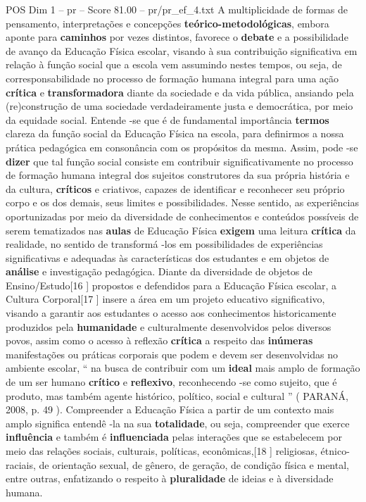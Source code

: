 \begin{textsample}{POS Dim 1 – pr – Score 81.00 – pr/pr\_ef\_4.txt}
A multiplicidade de formas de pensamento, interpretações e concepções \textbf{teórico-metodológicas}, embora aponte para \textbf{caminhos} por vezes distintos, favorece o \textbf{debate} e a possibilidade de avanço da Educação Física escolar, visando à sua contribuição significativa em relação à função social que a escola vem assumindo nestes tempos, ou seja, de corresponsabilidade no processo de formação humana integral para uma ação \textbf{crítica} e \textbf{transformadora} diante da sociedade e da vida pública, ansiando pela (re)construção de uma sociedade verdadeiramente justa e democrática, por meio da equidade social.
Entende -se que é de fundamental importância \textbf{termos} clareza da função social da Educação Física na escola, para definirmos a nossa prática pedagógica em consonância com os propósitos da mesma.
Assim, pode -se \textbf{dizer} que tal função social consiste em contribuir significativamente no processo de formação humana integral dos sujeitos construtores da sua própria história e da cultura, \textbf{críticos} e criativos, capazes de identificar e reconhecer seu próprio corpo e os dos demais, seus limites e possibilidades.
Nesse sentido, as experiências oportunizadas por meio da diversidade de conhecimentos e conteúdos possíveis de serem tematizados nas \textbf{aulas} de Educação Física \textbf{exigem} uma leitura \textbf{crítica} da realidade, no sentido de transformá -los em possibilidades de experiências significativas e adequadas às características dos estudantes e em objetos de \textbf{análise} e investigação pedagógica.
Diante da diversidade de objetos de Ensino/Estudo[16 ] propostos e defendidos para a Educação Física escolar, a Cultura Corporal[17 ] insere a área em um projeto educativo significativo, visando a garantir aos estudantes o acesso aos conhecimentos historicamente produzidos pela \textbf{humanidade} e culturalmente desenvolvidos pelos diversos povos, assim como o acesso à reflexão \textbf{crítica} a respeito das \textbf{inúmeras} manifestações ou práticas corporais que podem e devem ser desenvolvidas no ambiente escolar, “ na busca de contribuir com um \textbf{ideal} mais amplo de formação de um ser humano \textbf{crítico} e \textbf{reflexivo}, reconhecendo -se como sujeito, que é produto, mas também agente histórico, político, social e cultural ” ( PARANÁ, 2008, p. 49 ).
Compreender a Educação Física a partir de um contexto mais amplo significa entendê -la na sua \textbf{totalidade}, ou seja, compreender que exerce \textbf{influência} e também é \textbf{influenciada} pelas interações que se estabelecem por meio das relações sociais, culturais, políticas, econômicas,[18 ] religiosas, étnico-raciais, de orientação sexual, de gênero, de geração, de condição física e mental, entre outras, enfatizando o respeito à \textbf{pluralidade} de ideias e à diversidade humana.

\end{textsample}
